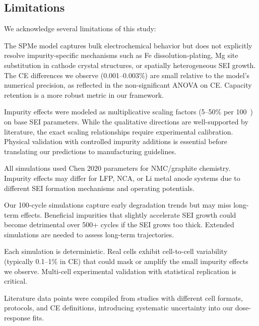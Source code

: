 \subsection{Limitations}
\label{sec:limitations}

We acknowledge several limitations of this study:

The \pybamm SPMe model captures bulk electrochemical behavior but does not explicitly resolve impurity-specific mechanisms such as Fe dissolution-plating, Mg site substitution in cathode crystal structures, or spatially heterogeneous SEI growth. The CE differences we observe (0.001--0.003\%) are small relative to the model's numerical precision, as reflected in the non-significant ANOVA on CE. Capacity retention is a more robust metric in our framework.

Impurity effects were modeled as multiplicative scaling factors (5--50\% per 100~\ppm) on base SEI parameters. While the qualitative directions are well-supported by literature, the exact scaling relationships require experimental calibration. Physical validation with controlled impurity additions is essential before translating our predictions to manufacturing guidelines.

All simulations used Chen 2020 parameters for NMC/graphite chemistry. Impurity effects may differ for LFP, NCA, or Li metal anode systems due to different SEI formation mechanisms and operating potentials.

Our 100-cycle simulations capture early degradation trends but may miss long-term effects. Beneficial impurities that slightly accelerate SEI growth could become detrimental over 500+ cycles if the SEI grows too thick. Extended simulations are needed to assess long-term trajectories.

Each simulation is deterministic. Real cells exhibit cell-to-cell variability (typically 0.1--1\% in CE) that could mask or amplify the small impurity effects we observe. Multi-cell experimental validation with statistical replication is critical.

Literature data points were compiled from studies with different cell formats, protocols, and CE definitions, introducing systematic uncertainty into our dose-response fits.
